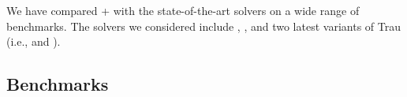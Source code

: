
We have compared {\ostrich}+ with the state-of-the-art solvers on a wide range of benchmarks. The solvers we considered include {\cvc} \cite{cvc4}, {\zthree} \cite{Z3-str}, and two latest variants of Trau (i.e., {\trauplus} \cite{AbdullaA+19} and {\zthreetrau} \cite{Z3-trau}).



\subsection{Benchmarks}
 


